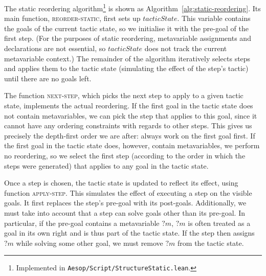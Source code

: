 \documentclass[sigplan,10pt,anonymous,review]{acmart}
\newcommand{\mvar}[1]{{?#1}}
\begin{document}
The static reordering algorithm\footnote{Implemented in \texttt{Aesop/Script/StructureStatic.lean}.} is shown as Algorithm~\ref{alg:static-reordering}.
Its main function, \textsc{reorder-static}, first sets up $\mathit{tacticState}$.
This variable contains the goals of the current tactic state, so we initialise it with the pre-goal of the first step.
(For the purposes of static reordering, metavariable assignments and declarations are not essential, so $\mathit{tacticState}$ does not track the current metavariable context.)
The remainder of the algorithm iteratively selects steps and applies them to the tactic state (simulating the effect of the step's tactic) until there are no goals left.

The function \textsc{next-step}, which picks the next step to apply to a given tactic state, implements the actual reordering.
If the first goal in the tactic state does not contain metavariables, we can pick the step that applies to this goal, since it cannot have any ordering constraints with regards to other steps.
This gives us precisely the depth-first order we are after: always work on the first goal first.
If the first goal in the tactic state does, however, contain metavariables, we perform no reordering, so we select the first step (according to the order in which the steps were generated) that applies to any goal in the tactic state.

Once a step is chosen, the tactic state is updated to reflect its effect, using function \textsc{apply-step}.
This simulates the effect of executing a step on the visible goals.
It first replaces the step's pre-goal with its post-goals.
Additionally, we must take into account that a step can solve goals other than its pre-goal.
In particular, if the pre-goal contains a metavariable $\mvar{m}$, $\mvar{m}$ is often treated as a goal in its own right and is thus part of the tactic state.
If the step then assigns $\mvar{m}$ while solving some other goal, we must remove $\mvar{m}$ from the tactic state.
\end{document}

